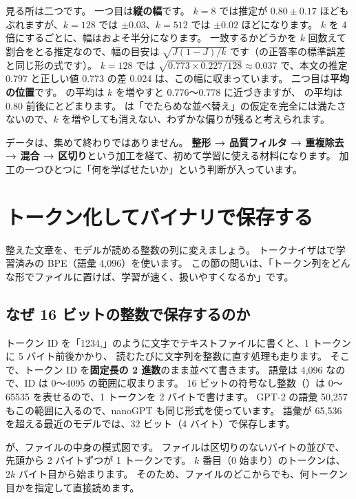 見る所は二つです。
一つ目は\textbf{縦の幅}です。
$k=8$ では推定が $0.80\pm0.17$ ほどもぶれますが、$k=128$ では $\pm0.03$、$k=512$ では $\pm0.02$ ほどになります。
$k$ を 4 倍にするごとに、幅はおよそ半分になります。
一致するかどうかを $k$ 回数えて割合をとる推定なので、幅の目安は $\sqrt{J(1-J)/k}$ です（の正答率の標準誤差と同じ形の式です）。
$k=128$ では $\sqrt{0.773\times0.227/128}\approx0.037$ で、本文の推定 0.797 と正しい値 0.773 の差 0.024 は、この幅に収まっています。
二つ目は\textbf{平均の位置}です。
 の平均は $k$ を増やすと 0.776〜0.778 に近づきますが、 の平均は 0.80 前後にとどまります。
 は「でたらめな並べ替え」の仮定を完全には満たさないので、$k$ を増やしても消えない、わずかな偏りが残ると考えられます。

データは、集めて終わりではありません。
\textbf{整形 → 品質フィルタ → 重複除去 → 混合 → 区切り}という加工を経て、初めて学習に使える材料になります。
加工の一つひとつに「何を学ばせたいか」という判断が入っています。

\section{トークン化してバイナリで保存する}\label{sec:pt-binary}

整えた文章を、モデルが読める整数の列に変えましょう。
トークナイザはで学習済みの BPE（語彙 4,096）を使います。
この節の問いは、「トークン列をどんな形でファイルに置けば、学習が速く、扱いやすくなるか」です。

\subsection{なぜ 16 ビットの整数で保存するのか}

トークン ID を「1234,」のように文字でテキストファイルに書くと、1 トークンに 5 バイト前後かかり、
読むたびに文字列を整数に直す処理も走ります。
そこで、トークン ID を\textbf{固定長の 2 進数}のまま並べて書きます。
語彙は 4,096 なので、ID は 0〜4095 の範囲に収まります。
16 ビットの符号なし整数（）は 0〜65535 を表せるので、1 トークンを 2 バイトで書けます。
GPT-2 の語彙 50,257 もこの範囲に入るので、nanoGPT も同じ形式を使っています\cite{karpathy2022nanogpt}。
語彙が 65,536 を超える最近のモデルでは、32 ビット（4 バイト）で保存します。

が、ファイルの中身の模式図です。
ファイルは区切りのないバイトの並びで、先頭から 2 バイトずつが 1 トークンです。
$k$ 番目（0 始まり）のトークンは、$2k$ バイト目から始まります。
そのため、ファイルのどこからでも、何トークン目かを指定して直接読めます。

